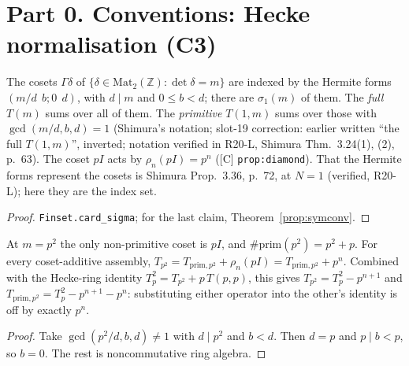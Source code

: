 \chapter{Part 0. Conventions: Hecke normalisation (C3)}\label{ch:hecke}

\begin{definition}\label{conv:hecke}
  \leanok
  The cosets $\Gamma\delta$ of $\{\delta\in\mathrm{Mat}_2(\mathbb Z):\det\delta=m\}$ are indexed by the Hermite forms $(m/d\ \ b;0\ \ d)$, with $d\mid m$ and
  $0\le b<d$; there are $\sigma_1(m)$ of them. The \emph{full} $T(m)$ sums over all of them. The \emph{primitive} $T(1,m)$ sums over those with $\gcd(m/d,b,d)=1$
  (Shimura's notation; slot-19 correction: earlier written ``the full $T(1,m)$'', inverted; notation verified in R20-L, Shimura Thm.~3.24(1), (2), p.~63). The coset $pI$ acts by $\rho_n(pI)=p^n$ ([C] \texttt{prop:diamond}).
  That the Hermite forms represent the cosets is Shimura Prop.~3.36, p.~72, at $N=1$ (verified, R20-L); here they are the index set.
\end{definition}
\begin{proof}
  \leanok
  \texttt{Finset.card\_sigma}; for the last claim, Theorem~\ref{prop:symconv}.
\end{proof}

\begin{theorem}[E1: full $=$ primitive $+\,p^n$]\label{bridge:fullprimitive}
  \leanok
  At $m=p^2$ the only non-primitive coset is $pI$, and $\#\mathrm{prim}(p^2)=p^2+p$. For every coset-additive assembly,
  $T_{p^2}=T_{\mathrm{prim},p^2}+\rho_n(pI)=T_{\mathrm{prim},p^2}+p^n$. Combined with the Hecke-ring identity
  $T_p^2=T_{p^2}+p\,T(p,p)$, this gives $T_{p^2}=T_p^2-p^{n+1}$ and
  $T_{\mathrm{prim},p^2}=T_p^2-p^{n+1}-p^{n}$: substituting either operator into the other's identity is off by exactly $p^n$.
\end{theorem}
\begin{proof}
  \leanok
  Take $\gcd(p^2/d,b,d)\ne1$ with $d\mid p^2$ and $b<d$. Then $d=p$ and $p\mid b<p$, so $b=0$. The rest is noncommutative ring algebra.
\end{proof}

